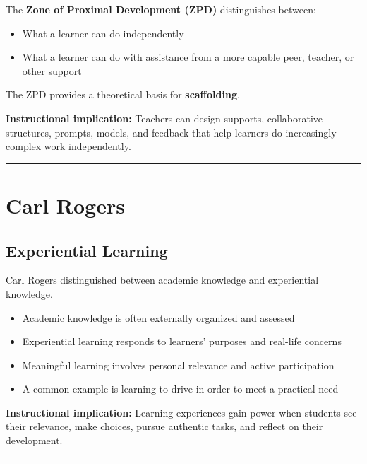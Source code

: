 \documentclass[
  letterpaper,
  DIV=11,
  numbers=noendperiod]{scrartcl}
\providecommand{\tightlist}{%
  \setlength{\itemsep}{0pt}\setlength{\parskip}{0pt}}\usepackage{longtable,booktabs,array}
\begin{document}
The \textbf{Zone of Proximal Development (ZPD)} distinguishes between:

\begin{itemize}
\tightlist
\item
  What a learner can do independently
\item
  What a learner can do with assistance from a more capable peer,
  teacher, or other support
\end{itemize}

The ZPD provides a theoretical basis for \textbf{scaffolding}.

\textbf{Instructional implication:} Teachers can design supports,
collaborative structures, prompts, models, and feedback that help
learners do increasingly complex work independently.

\begin{center}\rule{0.5\linewidth}{0.5pt}\end{center}

\section{Carl Rogers}\label{carl-rogers}

\subsection{Experiential Learning}\label{experiential-learning}

Carl Rogers distinguished between academic knowledge and experiential
knowledge.

\begin{itemize}
\tightlist
\item
  Academic knowledge is often externally organized and assessed
\item
  Experiential learning responds to learners' purposes and real-life
  concerns
\item
  Meaningful learning involves personal relevance and active
  participation
\item
  A common example is learning to drive in order to meet a practical
  need
\end{itemize}

\textbf{Instructional implication:} Learning experiences gain power when
students see their relevance, make choices, pursue authentic tasks, and
reflect on their development.

\begin{center}\rule{0.5\linewidth}{0.5pt}\end{center}
\end{document}
